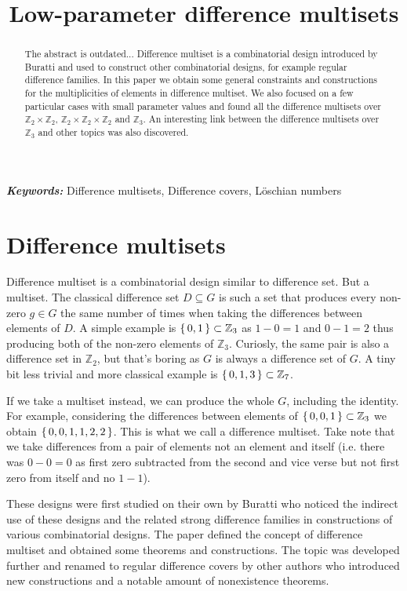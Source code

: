\documentclass{article}
\title{Low-parameter difference multisets}
\date{}
\author{}
\theoremstyle{plain}
\theoremstyle{definition}
\theoremstyle{remark}
\providecommand{\keywords}[1]{\textbf{\textit{Keywords: }} #1}
\begin{document}
	\maketitle
	
	\begin{abstract}
	The abstract is outdated...
		Difference multiset is a combinatorial design introduced by Buratti \cite{buratti1999old} and used to construct other combinatorial designs, for example regular difference families. In this paper we obtain some general constraints and constructions for the multiplicities of elements in difference multiset. We also focused on a few particular cases with small parameter values and found all the difference multisets over $\mathbb Z_2 \times \mathbb Z_2$, $\mathbb Z_2 \times \mathbb Z_2 \times \mathbb Z_2$ and $\mathbb Z_3$. An interesting link between the difference multisets over $\mathbb Z_3$ and other topics was also discovered.
	\end{abstract}
	
	\keywords{Difference multisets, Difference covers, Löschian numbers}
    
    \section{Difference multisets}
        
        Difference multiset is a combinatorial design similar to difference set. But a multiset. The classical difference set $D \subseteq G$ is such a set that produces every non-zero $g \in G$ the same number of times when taking the differences between elements of $D$. A simple example is $\set{0,1} \subset \mathbb Z_3$ as $1-0=1$ and $0-1=2$ thus producing both of the non-zero elements of $\mathbb Z_3$. Curiosly, the same pair is also a difference set in $\mathbb Z_2$, but that's boring as $G$ is always a difference set of $G$. A tiny bit less trivial and more classical example is $\set{0,1,3} \subset \mathbb Z_7$.
        
        If we take a multiset instead, we can produce the whole $G$, including the identity. For example, considering the differences between elements of $\set{0,0,1} \subset \mathbb Z_3$ we obtain $\set{0,0,1,1,2,2}$. This is what we call a difference multiset. Take note that we take differences from a pair of elements not an element and itself (i.e. there was $0-0=0$ as first zero subtracted from the second and vice verse but not first zero from itself and no $1-1$).
        
        These designs were first studied on their own by Buratti \cite{buratti1999old} who noticed the indirect use of these designs and the related strong difference families in constructions of various combinatorial designs. The paper defined the concept of difference multiset and obtained some theorems and constructions. The topic was developed further and renamed to regular difference covers by other authors \cite{arasu2005cyclic, arasu2005regular} who introduced new constructions and a notable amount of nonexistence theorems.
        
\end{document}
